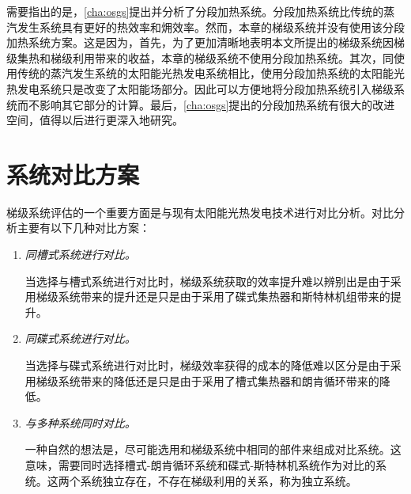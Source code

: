 需要指出的是，\autoref{cha:osgs}提出并分析了分段加热系统。分段加热系统比传统的蒸汽发生系统具有更好的热效率和㶲效率。然而，本章的梯级系统并没有使用该分段加热系统方案。这是因为，首先，为了更加清晰地表明本文所提出的梯级系统因梯级集热和梯级利用带来的收益，本章的梯级系统不使用分段加热系统。其次，同使用传统的蒸汽发生系统的太阳能光热发电系统相比，使用分段加热系统的太阳能光热发电系统只是改变了太阳能场部分。因此可以方便地将分段加热系统引入梯级系统而不影响其它部分的计算。最后，\autoref{cha:osgs}提出的分段加热系统有很大的改进空间，值得以后进行更深入地研究。

\section{系统对比方案}

梯级系统评估的一个重要方面是与现有太阳能光热发电技术进行对比分析。对比分析主要有以下几种对比方案：

\begin{enumerate}[label=(\arabic*)]
	\item \emph{同槽式系统进行对比。} 

	\setlength\parindent{2em}当选择与槽式系统进行对比时，梯级系统获取的效率提升难以辨别出是由于采用梯级系统带来的提升还是只是由于采用了碟式集热器和斯特林机组带来的提升。
	\item \emph{同碟式系统进行对比。}
	
	当选择与碟式系统进行对比时，梯级效率获得的成本的降低难以区分是由于采用梯级系统带来的降低还是只是由于采用了槽式集热器和朗肯循环带来的降低。
	\item \emph{与多种系统同时对比。}
	
	一种自然的想法是，尽可能选用和梯级系统中相同的部件来组成对比系统。这意味，需要同时选择槽式-朗肯循环系统和碟式-斯特林机系统作为对比的系统。这两个系统独立存在，不存在梯级利用的关系，称为独立系统。
	
\end{enumerate}

